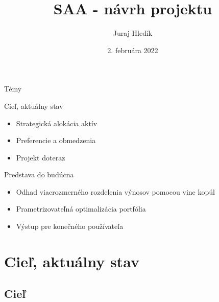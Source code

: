\documentclass{Bredelebeamer}
\title{SAA - návrh projektu}
\subtitle{}
\author{Juraj Hledík}
\institute[]{NBS}
\date{2. februára 2022}
\begin{document}
\begin{frame}
\titlepage
\end{frame}


\begin{frame}{Témy}
\begin{block}{Cieľ, aktuálny stav}
	\begin{itemize}
	\item Strategická alokácia aktív
	\item Preferencie a obmedzenia
	\item Projekt doteraz	
	\end{itemize}
\end{block}


\pause\begin{block}{Predstava do budúcna}
	\begin{itemize}
		\item Odhad viacrozmerného rozdelenia výnosov pomocou vine kopúl
		\item Prametrizovateľná optimalizácia portfólia
		\item Výstup pre konečného používateľa
	\end{itemize}
\end{block}
\end{frame}

\section{Cieľ, aktuálny stav}
\subsection{Cieľ}
\end{document}
